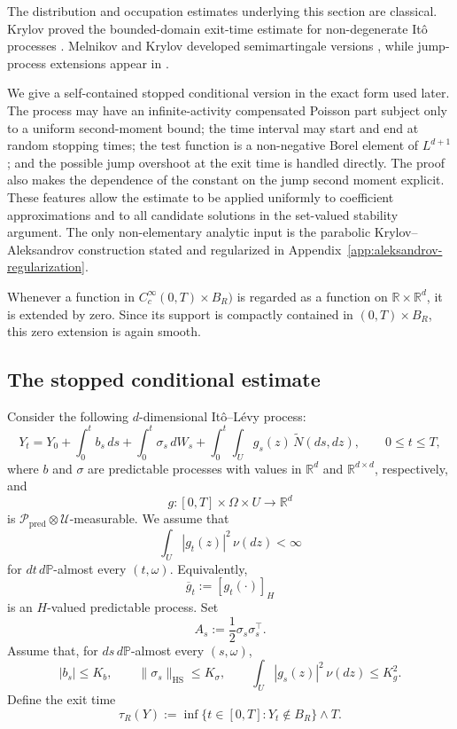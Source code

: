 \documentclass[12pt,oneside, reqno]{amsart}
\numberwithin{equation}{section}
\begin{document}
	The distribution and occupation estimates underlying this section are classical. Krylov proved the bounded-domain exit-time estimate for non-degenerate It\^o processes \cite{Krylov-1969,Krylov-1980}. 	Melnikov and Krylov developed semimartingale versions
	\cite{Melnikov-1983,Krylov-1987}, while jump-process extensions appear	in \cite{Anulova-Pragarauskas-1977}. 
	
	We give a self-contained stopped conditional version in the exact form	used later. The process may have an infinite-activity compensated	Poisson part subject only to a uniform second-moment bound; the time	interval may start and end at random stopping times; the test function
	is a non-negative Borel element of $L^{d+1}$; and the possible jump	overshoot at the exit time is handled directly. The proof also makes the dependence of the constant on the jump second moment explicit. These features allow the estimate to be applied uniformly to coefficient
	approximations and to all candidate solutions in the set-valued	stability argument. The only non-elementary analytic input is the	parabolic Krylov--Aleksandrov construction stated and regularized in	Appendix~\ref{app:aleksandrov-regularization}.
	
	
	Whenever a function in $C_c^\infty(0,T)\times B_R)$ is regarded as a function on	$\mathbb R\times\mathbb R^d$, it is extended by zero. Since its support is	compactly contained in $(0,T)\times B_R$, this zero extension is again	smooth.
	
	\subsection{The stopped conditional estimate}
	
	Consider the following $d$-dimensional	It\^o--L\'evy process:
	\begin{equation}
		\label{eq:general-ito-levy-process}
		Y_t	=Y_0+\int_0^t b_s\,ds+\int_0^t\sigma_s\,dW_s+\int_0^t\int_U g_s(z)\,\widetilde N(ds,dz),
		\qquad 0\le t\le T,
	\end{equation}
	where \(b\) and \(\sigma\) are predictable processes with values in	\(\mathbb R^d\) and \(\mathbb R^{d\times d}\), respectively, and
	\[g:[0,T]\times\Omega\times U\longrightarrow\mathbb R^d\]
	is
	\(\mathcal P_{\mathrm{pred}}\otimes\mathcal U\)-measurable. We assume	that
	\[
	\int_U|g_t(z)|^2\,\nu(dz)<\infty
	\]
	for \(dt\,d\mathbb P\)-almost every \((t,\omega)\). Equivalently,
	\[
	\overline g_t:=[g_t(\cdot)]_H
	\]
	is an \(H\)-valued predictable process. Set
	\begin{equation}
		\label{eq:continuous-covariance}
		A_s:=\frac12\sigma_s\sigma_s^\top.
	\end{equation}
	Assume that, for $ds\,d\mathbb P$-almost every $(s,\omega)$,
	\begin{equation}
		\label{eq:ito-levy-uniform-bounds}
		|b_s|\le K_b,\qquad\|\sigma_s\|_{\mathrm{HS}}\le K_\sigma,\qquad	\int_U|g_s(z)|^2\,\nu(dz)\le K_g^2.
	\end{equation}
	Define the exit time
	\[
	\tau_R(Y):=	\inf\{t\in[0,T]:Y_t\notin B_R\}\wedge T.
	\]
	
\end{document}
